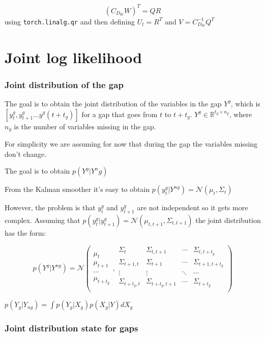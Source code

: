 \documentclass{article}
\let\Oldsection\section
\renewcommand{\section}{\FloatBarrier\Oldsection}
\let\Oldsubsubsection\subsubsection
\renewcommand{\subsubsection}{\FloatBarrier\Oldsubsubsection}
\begin{document}
$$(C_{D_W}W)^T = QR$$ using \verb|torch.linalg.qr| and then defining $U_t = R^T$ and $V=C_{D_W}^{-1}Q^T$

\section{Joint log likelihood}

\subsubsection{Joint distribution of the gap}

The goal is to obtain the joint distribution of the variables in the gap $Y^g$, which is $[y^g_t, y^g_{t+1} ... y^g(t+t_g)]$
for a gap that goes from $t$ to $t+t_g$. $Y^g \in \mathbb{R}^{t_g \times n_g}$, where $n_g$ is the number of variables missing in the gap.

For simplicity we are assuming for now that during the gap the variables missing don't change.

The goal is to obtain $p(Y^g|Y^ng)$

From the Kalman smoother it's easy to obtain $p(y^g_t|Y^{ng}) = \mathcal{N}(\mu_{t}, \Sigma_{t})$

However, the problem is that $y^g_t$ and $y^g_{t+1}$ are not independent so it gets more complex.
Assuming that $p(y^g_t|y^g_{t+1}) = \mathcal{N}(\mu_{t,t+1}, \Sigma_{t,t+1})$ the joint distribution has the form:

$$ p(Y^g|Y^{ng}) = \mathcal{N}\left(\begin{array}{c}
     \mu_{t}   \\
     \mu_{t+1} \\
     \cdots    \\
     \mu_{t+t_g}
\end{array},
\begin{array}{cccc}
    \Sigma_{t}       & \Sigma_{t,t+1}     & \cdots & \Sigma_{t,t+t_g}   \\
    \Sigma_{t+1,t}   & \Sigma_{t+1}       & \cdots & \Sigma_{t+1,t+t_g} \\
    \vdots           & \vdots             & \ddots & \cdots             \\ 
    \Sigma_{t+t_g,t} & \Sigma_{t+t_g,t+1} & \cdots & \Sigma_{t+t_g}     \\
\end{array}\right)$$


$p(Y_g|Y_{ng}) = \int p(Y_g|X_g)p(X_g|Y)dX_g$


\subsubsection{Joint distribution state for gaps}
\end{document}
